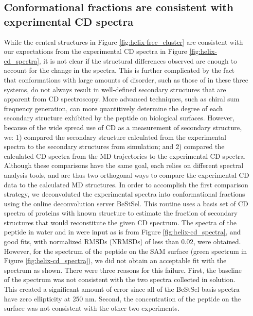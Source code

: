 \subsection{Conformational fractions are consistent with experimental CD spectra}

While the central structures in Figure \ref{fig:helix-free_cluster} are consistent with our expectations from the experimental CD spectra in Figure \ref{fig:helix-cd_spectra}, it is not clear if the structural differences observed are enough to account for the change in the spectra. 
This is further complicated by the fact that conformations with large amounts of disorder, such as those of \pep{} in these three systems, do not always result in well-defined secondary structures that are apparent from CD spectroscopy. 
More advanced techniques, such as chiral sum frequency generation, can more quantitively determine the degree of each secondary structure exhibited by the peptide on biological surfaces\cite{Fu2011}. 
However, because of the wide spread use of CD as a measurement of secondary structure, we: 
1) compared the secondary structure calculated from the experimental spectra to the secondary structures from simulation; 
and 2) compared the calculated CD spectra from the MD trajectories to the experimental CD spectra. 
Although these comparisons have the same goal, each relies on different spectral analysis tools, and are thus two orthogonal ways to compare the experimental CD data to the calculated MD structures. 
In order to accomplish the first comparison strategy, we deconvoluted the experimental spectra into conformational fractions using the online deconvolution server BeStSel\cite{Micsonai2015, Micsonai2018}. 
This routine uses a basis set of CD spectra of proteins with known structure to estimate the fraction of secondary structures that would reconstitute the given CD spectrum. 
The spectra of the peptide in water and in \tbawat{} were input as is from Figure \ref{fig:helix-cd_spectra}, and good fits, with normalized RMSDs (NRMSDs) of less than 0.02, were obtained. 
However, for the spectrum of the peptide on the SAM surface (green spectrum in Figure \ref{fig:helix-cd_spectra}), we did not obtain an acceptable fit with the spectrum as shown. 
There were three reasons for this failure. 
First, the baseline of the spectrum was not consistent with the two spectra collected in solution. 
This created a significant amount of error since all of the BeStSel basis spectra have zero ellipticity at 250 nm. 
Second, the concentration of the peptide on the surface was not consistent with the other two experiments. 
